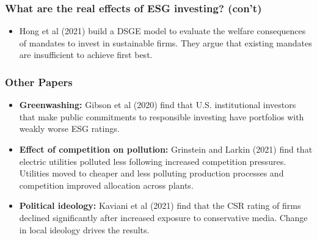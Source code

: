 \documentclass[usenames,dvipsnames, handout]{beamer}
\begin{document}
\begin{frame}
\frametitle{What are the real effects of ESG investing? (con't)}
\begin{itemize}
\item Hong et al (2021) build a DSGE model to evaluate the welfare consequences of mandates to invest in sustainable firms. They argue that existing mandates are insufficient to achieve first best.
\end{itemize}
\hyperlink{mq}{}
\end{frame}



\begin{frame}[label=q_o]
\frametitle{Other Papers}
\begin{itemize}[<+->]
\item \textbf{Greenwashing:} Gibson et al (2020) find that U.S. institutional investors that make public commitments to responsible investing have portfolios with weakly worse ESG ratings.
\bigskip
\item \textbf{Effect of competition on pollution:} Grinstein and Larkin (2021) find that electric utilities polluted less following increased competition pressures. Utilities moved to cheaper and less polluting production processes and competition improved allocation across plants.
\bigskip
\item \textbf{Political ideology:} Kaviani et al (2021) find that the CSR rating of firms declined significantly after increased exposure to conservative media. Change in local ideology drives the results.
\end{itemize}
\hyperlink{mq}{}
\end{frame}
\end{document}
